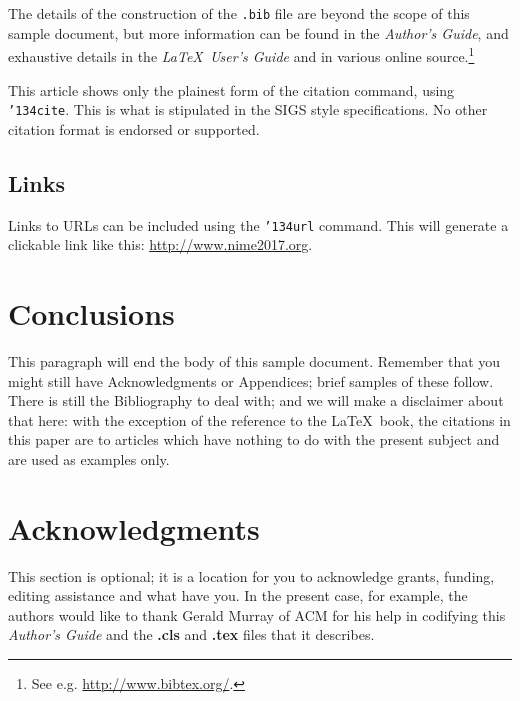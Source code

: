 \documentclass{nime-alternate}
\begin{document}
The details of the construction of the \texttt{.bib} file
are beyond the scope of this sample document, but more
information can be found in the \textit{Author's Guide},
and exhaustive details in the \textit{\LaTeX\ User's
Guide} \cite{Lamport:LaTeX} and in various online source.\footnote{See e.g. \url{http://www.bibtex.org/}.}

This article shows only the plainest form
of the citation command, using \texttt{{\char'134}cite}.
This is what is stipulated in the SIGS style specifications.
No other citation format is endorsed or supported.


\subsection{Links}

Links to URLs can be included using the \texttt{{\char'134}url} command. This will generate a clickable link like this: \url{http://www.nime2017.org}.


\section{Conclusions}
This paragraph will end the body of this sample document.
Remember that you might still have Acknowledgments or
Appendices; brief samples of these
follow.  There is still the Bibliography to deal with; and
we will make a disclaimer about that here: with the exception
of the reference to the \LaTeX\ book, the citations in
this paper are to articles which have nothing to
do with the present subject and are used as
examples only.

\section{Acknowledgments}
This section is optional; it is a location for you
to acknowledge grants, funding, editing assistance and
what have you.  In the present case, for example, the
authors would like to thank Gerald Murray of ACM for
his help in codifying this \textit{Author's Guide}
and the \textbf{.cls} and \textbf{.tex} files that it describes.

%

%
%
\appendix
\end{document}

